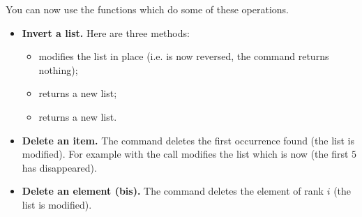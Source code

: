 \documentclass[11pt,class=report,crop=false]{standalone}
\begin{document}
\begin{cours}
  You can now use the \Python{} functions which do some of these operations.
  
\begin{itemize}
  \item \textbf{Invert a list.} Here are three methods: 
\begin{itemize}
  \item {} modifies the list in place (i.e.  is now reversed, the command returns nothing);
  \item {} returns a new list;
  \item {} returns a new list. 
\end{itemize}  

  \item \textbf{Delete an item.}  The command  deletes the first occurrence found (the list is modified). For example with  the call  modifies the list which is now  \ci{[2,3,8,5]} (the first $5$ has disappeared).
  
   \item \textbf{Delete an element (bis).}  The command  deletes the element of rank $i$ (the list is modified).
  
\end{itemize}
\end{cours}



\end{document}
